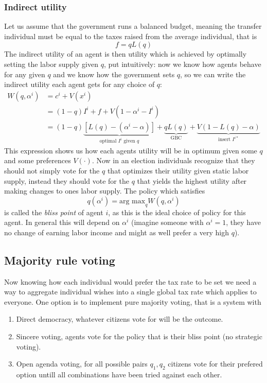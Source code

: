 \subsubsection{Indirect utility}
Let us assume that the government runs a balanced budget, meaning the transfer individual must be equal to the taxes raised from the average individual, that is 
\begin{equation}
  f = qL(q)
\end{equation}
The indirect utility of an agent is then utility which is achieved by optimally setting the labor supply given $q$, put intuitively: now we know how agents behave for any given $q$ and we know how the government sets $q$, so we can write the indirect utility each agent gets for any choice of $q$: 
\begin{equation} \label{eq: indirectutility}
  \begin{split}
    W(q, \alpha^i) &= c^i + V(x^i) \\ 
    &= (1-q)I^i + f + V(1-\alpha^i - I^i) \\ 
    &= (1-q)\underbrace{\left[L(q) - (\alpha^i - \alpha) \right]}_{\text{optimal $I^i$ given } q} + \underbrace{qL(q)}_{\text{GBC}} + \underbrace{V(1 - L(q) - \alpha)}_{\text{insert } I^{i*}}
  \end{split}
\end{equation}
This expression shows us how each agents utility will be in optimum given some $q$ and some preferences $V(\cdot)$. Now in an election individuals recognize that they should not simply vote for the $q$ that optimizes their utility given static labor supply, instead they should vote for the $q$ that yields the highest utility after making changes to ones labor supply. The policy which satisfies 
\begin{equation}
  q(\alpha^i) = \text{arg max}_q W(q, \alpha^i)
\end{equation}
is called the \textit{bliss point} of agent $i$, as this is the ideal choice of policy for this agent. In general this will depend on $\alpha^i$ (imagine someone with $\alpha^i=1$, they have no change of earning labor income and might as well prefer a very high $q$). 

\subsection{Majority rule voting}
Now knowing how each individual would prefer the tax rate to be set we need a way to aggregate individual wishes into a single global tax rate which applies to everyone. One option is to implement pure majority voting, that is a system with
\begin{enumerate}
\item Direct democracy, whatever citizens vote for will be the outcome. 
\item Sincere voting, agents vote for the policy that is their bliss point (no strategic voting).
\item Open agenda voting, for all possible pairs $q_1, q_2$ citizens vote for their prefered option untill all combinations have been tried against each other.   
\end{enumerate}

